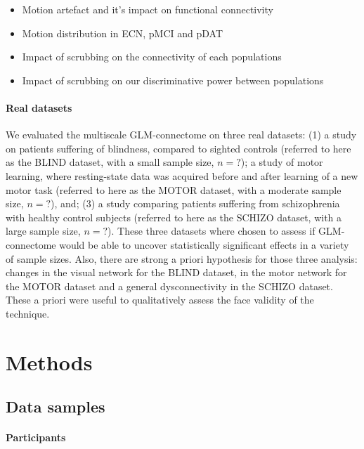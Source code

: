 \documentclass[authoryear,preprint,review]{elsarticle}
\begin{document}
\begin{itemize}
 \item Motion artefact and it's impact on functional connectivity
 \item Motion distribution in ECN, pMCI and pDAT
 \item Impact of scrubbing on the connectivity of each populations
 \item Impact of scrubbing on our discriminative power between populations
\end{itemize}



\paragraph{Real datasets}
We evaluated the multiscale GLM-connectome on three real datasets: (1) a study on patients suffering of blindness, compared to sighted controls (referred to here as the BLIND dataset, with a small sample size, $n=?$); a study of motor learning, where resting-state data was acquired before and after learning of a new motor task (referred to here as the MOTOR dataset, with a moderate sample size, $n=?$), and; (3) a study comparing patients suffering from schizophrenia with healthy control subjects (referred to here as the SCHIZO dataset, with a large sample size, $n=?$). These three datasets where chosen to assess if GLM-connectome would be able to uncover statistically significant effects in a variety of sample sizes. Also, there are strong a priori hypothesis for those three analysis: changes in the visual network for the BLIND dataset, in the motor network for the MOTOR dataset and a general dysconnectivity in the SCHIZO dataset. These a priori were useful to qualitatively assess the face validity of the technique. 



\section{Methods} 

\subsection{Data samples} 
\paragraph{Participants} %
\end{document}
